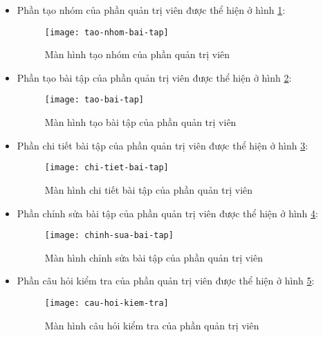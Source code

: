 \documentclass[../Thesis.tex]{subfiles}
\begin{document}
\begin{itemize}
                \item Phần tạo nhóm của phần quản trị viên được thể hiện ở hình \ref{fig:tao-nhom-bai-tap}:
                \begin{figure}[hbt!]
                    \centering\texttt{[image: tao-nhom-bai-tap]}
                    \caption{Màn hình tạo nhóm của phần quản trị viên}
                    \label{fig:tao-nhom-bai-tap}
                \end{figure}
                \FloatBarrier

                \item Phần tạo bài tập của phần quản trị viên được thể hiện ở hình \ref{fig:tao-bai-tap}:
                \begin{figure}[hbt!]
                    \centering\texttt{[image: tao-bai-tap]}
                    \caption{Màn hình tạo bài tập của phần quản trị viên}
                    \label{fig:tao-bai-tap}
                \end{figure}
                \FloatBarrier

                \item Phần chi tiết bài tập của phần quản trị viên được thể hiện ở hình \ref{fig:chi-tiet-bai-tap}:
                \begin{figure}[hbt!]
                    \centering\texttt{[image: chi-tiet-bai-tap]}
                    \caption{Màn hình chi tiết bài tập của phần quản trị viên}
                    \label{fig:chi-tiet-bai-tap}
                \end{figure}
                \FloatBarrier

                \item Phần chỉnh sửa bài tập của phần quản trị viên được thể hiện ở hình \ref{fig:chinh-sua-bai-tap}:
                \begin{figure}[hbt!]
                    \centering\texttt{[image: chinh-sua-bai-tap]}
                    \caption{Màn hình chỉnh sửa bài tập của phần quản trị viên}
                    \label{fig:chinh-sua-bai-tap}
                \end{figure}
                \FloatBarrier

                \item Phần câu hỏi kiểm tra của phần quản trị viên được thể hiện ở hình \ref{fig:cau-hoi-kiem-tra}:
                \begin{figure}[hbt!]
                    \centering\texttt{[image: cau-hoi-kiem-tra]}
                    \caption{Màn hình câu hỏi kiểm tra của phần quản trị viên}
                    \label{fig:cau-hoi-kiem-tra}
                \end{figure}
                \FloatBarrier


\end{itemize}
\end{document}
